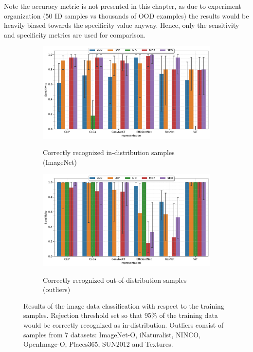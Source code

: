 Note the accuracy metric is not presented in this chapter, as due to experiment organization (50 ID samples vs thousands of OOD examples) the results would be heavily biased towards the specificity value anyway. Hence, only the sensitivity and specificity metrics are used for comparison.


\begin{figure}[t]
    \centering
    \begin{subfigure}[b]{\textwidth}
        \centering
        \caption{\small Correctly recognized in-distribution samples (ImageNet)}
        \includegraphics[width=\textwidth]{images/real-classification/barplot-ImageNet-sens_95(representation,model)-representation_CLIP,CoCa,ConvNeXT,EfficientNet,ResNet,ViT-class_0,999-data_ALL.pdf}
        \label{fig:imagenet-sensitivity}
    \end{subfigure}
    \begin{subfigure}[b]{\textwidth}
        \centering
        \caption{\small Correctly recognized out-of-distribution samples (outliers)}
        \includegraphics[width=\textwidth]{images/real-classification/barplot-ImageNet-spec_95(representation,model)-representation_CLIP,CoCa,ConvNeXT,EfficientNet,ResNet,ViT-class_0,999-data_ALL.pdf}
        \label{fig:imagenet-specificity}
    \end{subfigure}
    \caption{Results of the image data classification with respect to the training samples. Rejection threshold set so that 95\% of the training data would be correctly recognized as in-distribution. Outliers consist of samples from 7 datasets: ImageNet-O, iNaturalist, NINCO, OpenImage-O, Places365, SUN2012 and Textures.}
    \label{fig:image-classification}
\end{figure}

